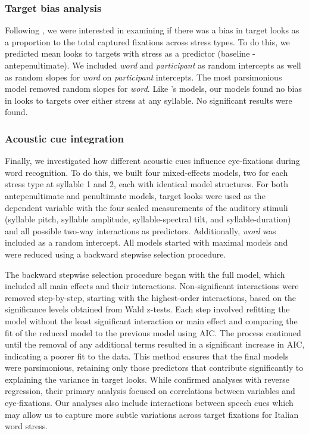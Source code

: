 \subsubsection{Target bias analysis}

Following \cite{Sulpizio_McQueen_2012}, we were interested in examining if there was a bias in target looks as a proportion to the total captured fixations across stress types. To do this, we predicted mean looks to targets with stress as a predictor (baseline - antepenultimate). We included \textit{word} and \textit{participant} as random intercepts as well as random slopes for \textit{word} on \textit{participant} intercepts. The most parsimonious model removed random slopes for \textit{word}. Like \cite{Sulpizio_McQueen_2012}'s models, our models found no bias in looks to targets over either stress at any syllable. No significant results were found.   


\subsubsection{Acoustic cue integration}

Finally, we investigated how different acoustic cues influence eye-fixations during word recognition. To do this, we built four mixed-effects models, two for each stress type at syllable 1 and 2, each with identical model structures. For both antepenultimate and penultimate models, target looks were used as the dependent variable with the four scaled measurements of the auditory stimuli (syllable pitch, syllable amplitude, syllable-spectral tilt, and syllable-duration) and all possible two-way interactions as predictors. Additionally, \textit{word} was included as a random intercept. All models started with maximal models and were reduced using a backward stepwise selection procedure. 

The backward stepwise selection procedure began with the full model, which included all main effects and their interactions. Non-significant interactions were removed step-by-step, starting with the highest-order interactions, based on the significance levels obtained from Wald z-tests. Each step involved refitting the model without the least significant interaction or main effect and comparing the fit of the reduced model to the previous model using AIC. The process continued until the removal of any additional terms resulted in a significant increase in AIC, indicating a poorer fit to the data. This method ensures that the final models were parsimonious, retaining only those predictors that contribute significantly to explaining the variance in target looks. While \cite{Sulpizio_McQueen_2012} confirmed analyses with reverse regression, their primary analysis focused on correlations between variables and eye-fixations. Our analyses also include interactions between speech cues which may allow us to capture more subtle variations across target fixations for Italian word stress.


